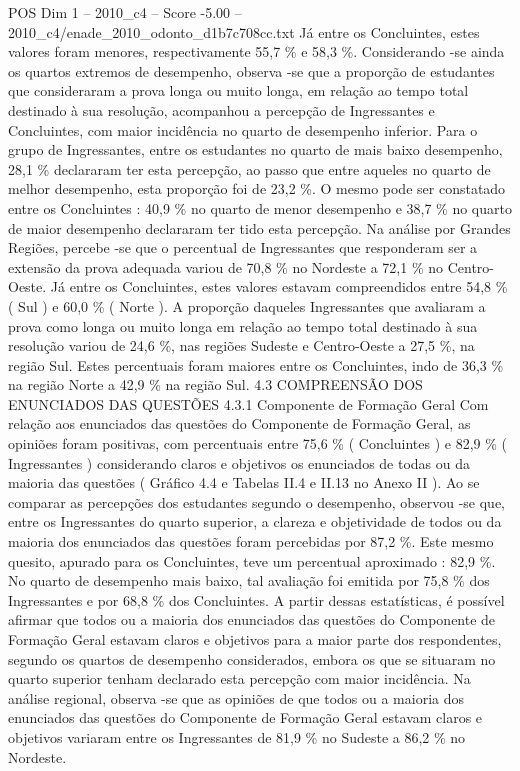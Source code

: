 \begin{textsample}{POS Dim 1 – 2010\_c4 – Score -5.00 – 2010\_c4/enade\_2010\_odonto\_d1b7c708cc.txt}
Já entre os Concluintes, estes valores foram menores, respectivamente 55,7 \% e 58,3 \%.
Considerando -se ainda os quartos extremos de desempenho, observa -se que a proporção de estudantes que consideraram a prova longa ou muito longa, em relação ao tempo total destinado à sua resolução, acompanhou a percepção de Ingressantes e Concluintes, com maior incidência no quarto de desempenho inferior.
Para o grupo de Ingressantes, entre os estudantes no quarto de mais baixo desempenho, 28,1 \% declararam ter esta percepção, ao passo que entre aqueles no quarto de melhor desempenho, esta proporção foi de 23,2 \%.
O mesmo pode ser constatado entre os Concluintes : 40,9 \% no quarto de menor desempenho e 38,7 \% no quarto de maior desempenho declararam ter tido esta percepção.
Na análise por Grandes Regiões, percebe -se que o percentual de Ingressantes que responderam ser a extensão da prova adequada variou de 70,8 \% no Nordeste a 72,1 \% no Centro-Oeste.
Já entre os Concluintes, estes valores estavam compreendidos entre 54,8 \% ( Sul ) e 60,0 \% ( Norte ).
A proporção daqueles Ingressantes que avaliaram a prova como longa ou muito longa em relação ao tempo total destinado à sua resolução variou de 24,6 \%, nas regiões Sudeste e Centro-Oeste a 27,5 \%, na região Sul.
Estes percentuais foram maiores entre os Concluintes, indo de 36,3 \% na região Norte a 42,9 \% na região Sul. 4.3 COMPREENSÃO DOS ENUNCIADOS DAS QUESTÕES 4.3.1 Componente de Formação Geral Com relação aos enunciados das questões do Componente de Formação Geral, as opiniões foram positivas, com percentuais entre 75,6 \% ( Concluintes ) e 82,9 \% ( Ingressantes ) considerando claros e objetivos os enunciados de todas ou da maioria das questões ( Gráfico 4.4 e Tabelas II.4 e II.13 no Anexo II ).
Ao se comparar as percepções dos estudantes segundo o desempenho, observou -se que, entre os Ingressantes do quarto superior, a clareza e objetividade de todos ou da maioria dos enunciados das questões foram percebidas por 87,2 \%.
Este mesmo quesito, apurado para os Concluintes, teve um percentual aproximado : 82,9 \%.
No quarto de desempenho mais baixo, tal avaliação foi emitida por 75,8 \% dos Ingressantes e por 68,8 \% dos Concluintes.
A partir dessas estatísticas, é possível afirmar que todos ou a maioria dos enunciados das questões do Componente de Formação Geral estavam claros e objetivos para a maior parte dos respondentes, segundo os quartos de desempenho considerados, embora os que se situaram no quarto superior tenham declarado esta percepção com maior incidência.
Na análise regional, observa -se que as opiniões de que todos ou a maioria dos enunciados das questões do Componente de Formação Geral estavam claros e objetivos variaram entre os Ingressantes de 81,9 \% no Sudeste a 86,2 \% no Nordeste.

\end{textsample}
